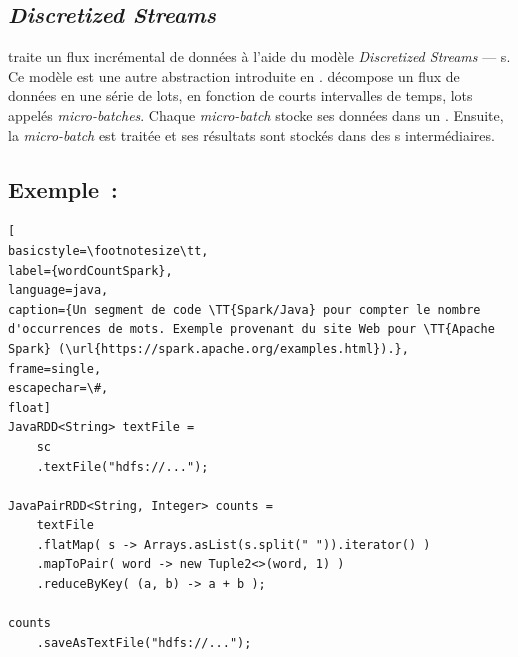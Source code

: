 



\subsection{\emph{Discretized Streams}}

 traite un flux incr\'emental de donn\'ees \`a l'aide du mod\`ele \emph{Discretized Streams} --- s.   
%
Ce mod\`ele est une autre abstraction introduite en . 
 d\'ecompose un flux de donn\'ees en une s\'erie de lots, en fonction de courts intervalles de temps, lots appel\'es \emph{micro-batches}. Chaque \emph{micro-batch} stocke ses donn\'ees dans un . Ensuite, la \emph{micro-batch} est trait\'ee et ses r\'esultats sont stock\'es dans des s interm\'ediaires.


\subsection{Exemple~: }


\begin{lstlisting}[
basicstyle=\footnotesize\tt,
label={wordCountSpark},
language=java,
caption={Un segment de code \TT{Spark/Java} pour compter le nombre d'occurrences de mots. Exemple provenant du site Web pour \TT{Apache Spark} (\url{https://spark.apache.org/examples.html}).},
frame=single,
escapechar=\#,
float]
JavaRDD<String> textFile = 
    sc
    .textFile("hdfs://...");

JavaPairRDD<String, Integer> counts = 
    textFile
    .flatMap( s -> Arrays.asList(s.split(" ")).iterator() )
    .mapToPair( word -> new Tuple2<>(word, 1) )
    .reduceByKey( (a, b) -> a + b );

counts
    .saveAsTextFile("hdfs://...");
\end{lstlisting}


